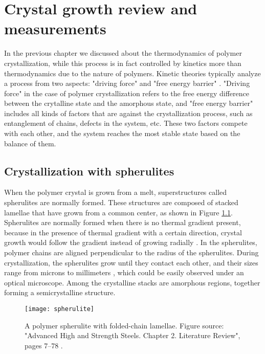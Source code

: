 \chapter{Crystal growth review and measurements}\label{chap_growth}
\graphicspath{{./growth/graphs/}}

In the previous chapter we discussed about the thermodynamics of polymer crystallization, while this process is in fact controlled by kinetics more than thermodynamics due to the nature of polymers. Kinetic theories typically analyze a process from two aspects: "driving force" and "free energy barrier" \cite{Zhang2016a}. "Driving force" in the case of polymer crystallization refers to the free energy difference between the crytalline state and the amorphous state, and "free energy barrier" includes all kinds of factors that are against the crystallization process, such as entanglement of chains, defects in the system, etc. These two factors compete with each other, and the system reaches the most stable state based on the balance of them.

\section{Crystallization with spherulites}

When the polymer crystal is grown from a melt, superstructures called spherulites are normally formed. These structures are composed of stacked lamellae that have grown from a common center, as shown in Figure \ref{fig:spherulite}. Spherulites are normally formed when there is no thermal gradient present, because in the presence of thermal gradient with a certain direction, crystal growth would follow the gradient instead of growing radially \cite{Carraher2003}. In the spherulites, polymer chains are aligned perpendicular to the radius of the spherulites. During crystallization, the spherulites grow until they contact each other, and their sizes range from microns to millimeters \cite{Vasile2000}, which could be easily observed under an optical microscope. Among the crystalline stacks are amorphous regions, together forming a semicrystalline structure.

\begin{figure}[H]
\center
\vspace{1 cm}
\texttt{[image: spherulite]}
\caption[A polymer spherulite with folded-chain lamellae.]{A polymer spherulite with folded-chain lamellae. Figure source: "Advanced High and Strength Steels. Chapter 2. Literature Review", pages 7–78 \cite{High}.}
\label{fig:spherulite}
\end{figure}

